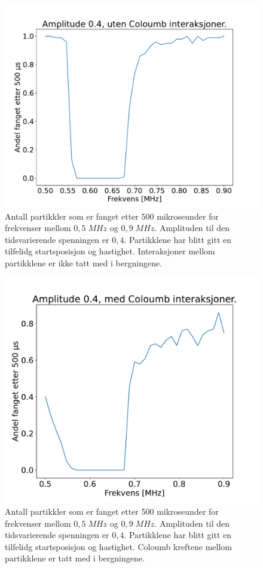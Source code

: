 \documentclass[reprint,english,notitlepage, nofootinbib]{revtex4-1}  %
\begin{document}
\begin{figure}[H]
\centering
\includegraphics[scale=0.3]{../Images/TrappedZoomed.pdf}
\caption{Antall partikkler som er fanget etter 500 mikroseunder for frekvenser mellom $0,5 \; MHz$ og $0,9 \; MHz$. Amplituden til den tidsvarierende spenningen er $0,4$. Partikklene har blitt gitt en tilfelidg startsposisjon og hastighet. Interaksjoner mellom partikklene er ikke tatt med i bergningene.}
\label{Fig:TrappedZ}
\end{figure}

\begin{figure}[H]
\centering
\includegraphics[scale=0.3]{../Images/TrappedColoumb.pdf}
\caption{Antall partikkler som er fanget etter 500 mikroseunder for frekvenser mellom $0,5 \; MHz$ og $0,9 \; MHz$. Amplituden til den tidsvarierende spenningen er $0,4$. Partikklene har blitt gitt en tilfelidg startsposisjon og hastighet. Coloumb kreftene mellom partikklene er tatt med i bergningene.}
\label{Fig:TrappedC}
\end{figure}
\end{document}
